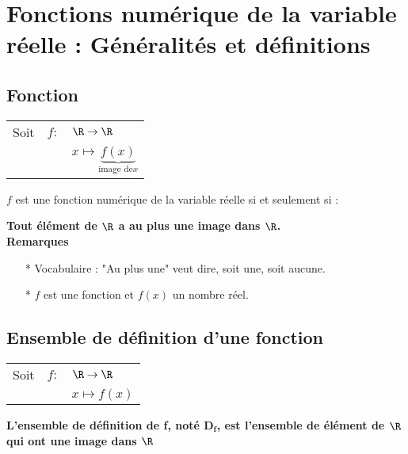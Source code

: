 \ifdefined\COMPLETE
\else
    
    
\fi

\section{Fonctions numérique de la variable réelle : Généralités et définitions}

\subsection{Fonction}

\begin{tabular}{lll}
Soit & $f:$ & $ \R \rightarrow \R$ \\
& & $x\mapsto \underbrace{f(x)}_{\textrm{image de} x}$ \\
\end{tabular}

$f$ est une fonction numérique de la variable réelle si et seulement si :

\textbf{Tout élément de $\mathbf{\R}$ a au plus une image dans $\mathbf{\R}$.} \\

\textbf{Remarques}

\begin{itemize}


\item[*]Vocabulaire : "Au plus une" veut dire, soit une, soit aucune. \\ 

\item[*] $f$ est une fonction et $f(x)$ un nombre réel.
\end{itemize}
\subsection{Ensemble de définition d'une fonction}

\begin{tabular}{lll}

Soit & $f:$& $ \R \rightarrow \R$ \\
& & $x\mapsto f(x)$ \\
\end{tabular}

\textbf{L'ensemble de définition de f, noté $ \mathbf{D_f} $, est l'ensemble de élément de $\mathbf{\R}$\\qui ont une image dans $\mathbf{\R}$}


